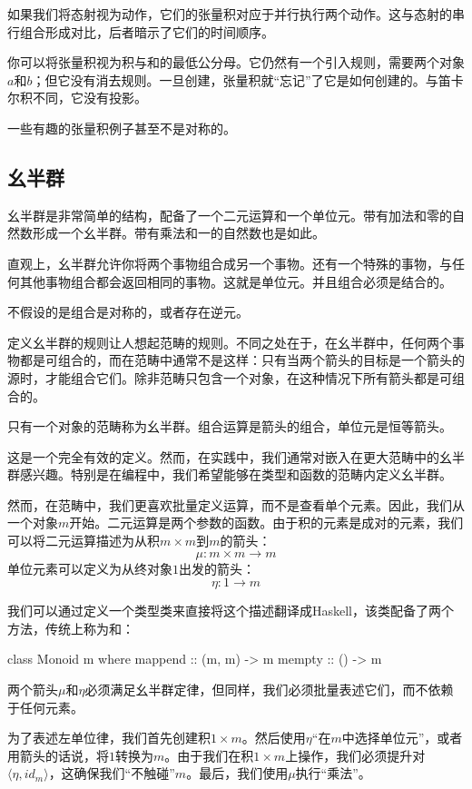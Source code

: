 \documentclass[DaoFP]{subfiles}
\begin{document}
如果我们将态射视为动作，它们的张量积对应于并行执行两个动作。这与态射的串行组合形成对比，后者暗示了它们的时间顺序。

你可以将张量积视为积与和的最低公分母。它仍然有一个引入规则，需要两个对象$a$和$b$；但它没有消去规则。一旦创建，张量积就“忘记”了它是如何创建的。与笛卡尔积不同，它没有投影。

一些有趣的张量积例子甚至不是对称的。

\subsection{幺半群}

幺半群是非常简单的结构，配备了一个二元运算和一个单位元。带有加法和零的自然数形成一个幺半群。带有乘法和一的自然数也是如此。

直观上，幺半群允许你将两个事物组合成另一个事物。还有一个特殊的事物，与任何其他事物组合都会返回相同的事物。这就是单位元。并且组合必须是结合的。

不假设的是组合是对称的，或者存在逆元。

定义幺半群的规则让人想起范畴的规则。不同之处在于，在幺半群中，任何两个事物都是可组合的，而在范畴中通常不是这样：只有当两个箭头的目标是一个箭头的源时，才能组合它们。除非范畴只包含一个对象，在这种情况下所有箭头都是可组合的。

只有一个对象的范畴称为幺半群。组合运算是箭头的组合，单位元是恒等箭头。

这是一个完全有效的定义。然而，在实践中，我们通常对嵌入在更大范畴中的幺半群感兴趣。特别是在编程中，我们希望能够在类型和函数的范畴内定义幺半群。

然而，在范畴中，我们更喜欢批量定义运算，而不是查看单个元素。因此，我们从一个对象$m$开始。二元运算是两个参数的函数。由于积的元素是成对的元素，我们可以将二元运算描述为从积$m \times m$到$m$的箭头：
\[ \mu \colon m \times m \to m \]
单位元素可以定义为从终对象$1$出发的箭头：
\[ \eta \colon 1 \to m \]

我们可以通过定义一个类型类来直接将这个描述翻译成Haskell，该类配备了两个方法，传统上称为和：
\begin{haskell}
class Monoid m where
  mappend :: (m, m) -> m
  mempty  :: () -> m
\end{haskell}

两个箭头$\mu$和$\eta$必须满足幺半群定律，但同样，我们必须批量表述它们，而不依赖于任何元素。

为了表述左单位律，我们首先创建积$1 \times m$。然后使用$\eta$“在$m$中选择单位元”，或者用箭头的话说，将$1$转换为$m$。由于我们在积$1 \times m$上操作，我们必须提升对$\langle \eta, id_m \rangle$，这确保我们“不触碰”$m$。最后，我们使用$\mu$执行“乘法”。
\end{document}
